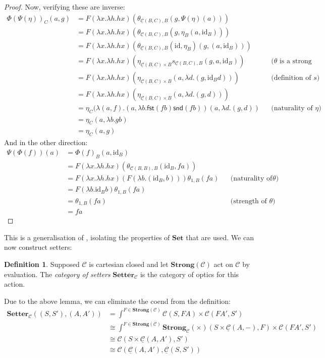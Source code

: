 \documentclass[11pt,a4paper]{article}
\theoremstyle{plain}
\theoremstyle{definition}
\newtheorem{definition}[theorem]{Definition}
\newcommand{\C}{\mathscr{C}}
\newcommand{\homC}{\underline{\C}}
\newcommand{\Set}{\mathbf{Set}}
\newcommand{\Setter}{\mathbf{Setter}}
\newcommand{\Strong}{\mathbf{Strong}}
\newcommand{\id}{\mathrm{id}}
\begin{document}
\begin{proof}
Now, verifying these are inverse:
\begin{align*}
\Phi(\Psi(\eta))_C (a,g)
&= F(\lambda x. \lambda h. h x)(\theta_{\homC(B, C), B}(g, \Psi(\eta)(a))) \\
&= F(\lambda x. \lambda h. h x)(\theta_{\homC(B, C), B}(g, \eta_B(a, \id_B))) \\
&= F(\lambda x. \lambda h. h x)(\theta_{\homC(B, C), B}(\id, \eta_B)(g, (a, \id_B))) \\
&= F(\lambda x. \lambda h. h x)(\eta_{\homC(B, C) \times B} s_{\homC(B, C), B}(g, a, \id_B)) && \text{($\theta$ is a strong transformation)}\\
&= F(\lambda x. \lambda h. h x)(\eta_{\homC(B, C) \times B} (a, \lambda d. (g, \id_B d)) ) && \text{(definition of $s$)}\\
&= F(\lambda x. \lambda h. h x)(\eta_{\homC(B, C) \times B} (a, \lambda d. (g, d)) ) \\
&= \eta_{C}(\lambda (a, f). (a, \lambda b. \mathsf{fst}(f b)\mathsf{snd}(f b)) (a, \lambda d. (g, d)) && \text{(naturality of $\eta$)}\\
&= \eta_{C}(a, \lambda b. g b) \\
&= \eta_{C}(a, g)
\end{align*}
And in the other direction:
\begin{align*}
\Psi(\Phi(f))(a) 
&= \Phi(f)_B(a, \id_B) \\
&= F(\lambda x. \lambda h. h x)(\theta_{\homC(B, B), B}(\id_B, f a))\\
&= F(\lambda x. \lambda h. h x)(F(\lambda b. (\id_B, b)))\theta_{1, B}(f a) && \text{(naturality of $\theta$)}\\
&= F(\lambda b. \id_B b)\theta_{1, B}(f a)\\
&= \theta_{1, B}(f a) && \text{(strength of $\theta$)}\\
&= f a
\end{align*}
\end{proof}

This is a generalisation of \cite[Proposition 2.2]{SecondOrderFunctionals}, isolating the properties of $\Set$ that are used. We can now construct setters: 

\begin{definition}
Supposed $\C$ is cartesian closed and let $\Strong(\C)$ act on $\C$ by evaluation. The \emph{category of setters} $\Setter_\C$ is the category of optics for this action.
\end{definition}

Due to the above lemma, we can eliminate the coend from the definition:
\begin{align*}
\Setter_\C((S, S'), (A, A')) &= \int^{F \in \Strong(\C)} \C(S, FA) \times \C(FA', S') \\
&\cong \int^{F \in \Strong(\C)} \Strong_\C(\times)(S \times \homC(A, -), F)  \times \C(FA', S') \\
&\cong \C(S \times \homC(A, A'), S') \\
&\cong \C(\homC(A, A'), \homC(S,S'))
\end{align*}
\end{document}
